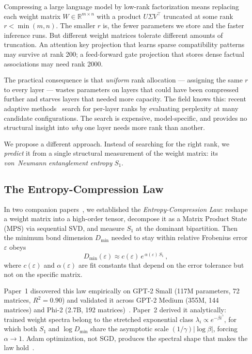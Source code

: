 \documentclass[11pt,a4paper]{article}
\newcommand{\Dmin}{D_{\min}}
\newcommand{\Svn}{S_1}
\begin{document}
Compressing a large language model by low-rank factorization
means replacing each weight matrix $W \in \mathbb{R}^{m \times n}$
with a product $U \Sigma V^\top$ truncated at some rank $r < \min(m,n)$.
The smaller $r$ is, the fewer parameters we store and the faster
inference runs.  But different weight matrices tolerate different
amounts of truncation.  An attention key projection that learns sparse
compatibility patterns may survive at rank 200; a feed-forward gate
projection that stores dense factual associations may need rank 2000.

The practical consequence is that \emph{uniform} rank allocation ---
assigning the same $r$ to every layer --- wastes parameters on
layers that could have been compressed further and starves layers
that needed more capacity.  The field knows this: recent adaptive
methods~\citep{Sun2025ara, Wang2024svd} search for per-layer ranks
by evaluating perplexity at many candidate configurations.  The
search is expensive, model-specific, and provides no structural
insight into \emph{why} one layer needs more rank than another.

We propose a different approach.  Instead of searching for the right
rank, we \emph{predict} it from a single structural measurement of
the weight matrix: its \emph{von~Neumann entanglement entropy}
$\Svn$.

\subsection{The Entropy-Compression Law}
\label{sec:intro-law}

In two companion papers~\citep{calderon2026cartography,
calderon2026theory}, we established the \emph{Entropy-Compression
Law}: reshape a weight matrix into a high-order tensor, decompose it
as a Matrix Product State (MPS) via sequential SVD, and measure
$\Svn$ at the dominant bipartition.  Then the minimum bond dimension
$\Dmin$ needed to stay within relative Frobenius error $\varepsilon$
obeys
\begin{equation}
  \label{eq:law}
  \Dmin(\varepsilon) \approx c(\varepsilon)\, e^{\,\alpha(\varepsilon)\,\Svn}\,,
\end{equation}
where $c(\varepsilon)$ and $\alpha(\varepsilon)$ are fit constants
that depend on the error tolerance but not on the specific matrix.

Paper~1 discovered this law empirically on GPT-2 Small (117M
parameters, 72 matrices, $R^2 = 0.90$) and validated it across
GPT-2 Medium (355M, 144 matrices) and Phi-2 (2.7B, 192
matrices)~\citep{calderon2026cartography}.  Paper~2 derived it
analytically: trained weight spectra belong to the stretched
exponential class $\lambda_i \propto e^{-\beta i^\gamma}$, for
which both $\Svn$ and $\log \Dmin$ share the asymptotic scale
$(1/\gamma)|\log \beta|$, forcing $\alpha \to 1$.  Adam
optimization, not SGD, produces the spectral shape that makes the
law hold~\citep{calderon2026theory}.
\end{document}
